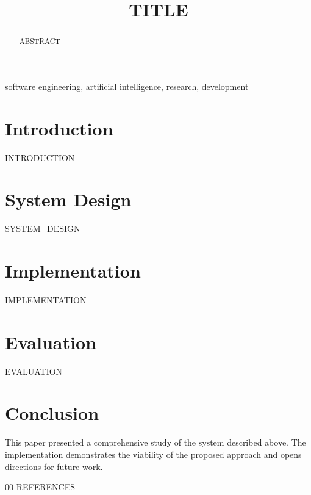 \documentclass[conference]{IEEEtran}
\begin{document}
\title{{{TITLE}}}

\author{
}

\maketitle

\begin{abstract}
{{ABSTRACT}}
\end{abstract}

\begin{IEEEkeywords}
software engineering, artificial intelligence, research, development
\end{IEEEkeywords}

\section{Introduction}
{{INTRODUCTION}}

\section{System Design}
{{SYSTEM_DESIGN}}

\section{Implementation}
{{IMPLEMENTATION}}

\section{Evaluation}
{{EVALUATION}}

\section{Conclusion}
This paper presented a comprehensive study of the system described above. The implementation demonstrates the viability of the proposed approach and opens directions for future work.

\begin{thebibliography}{00}
{{REFERENCES}}
\end{thebibliography}
\end{document}
